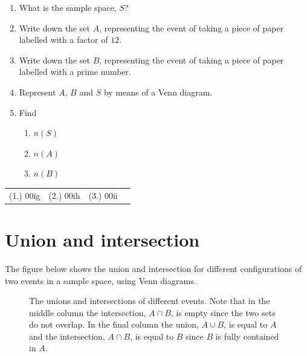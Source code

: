 \begin{exercises}{}
{\begin{enumerate}[itemsep=5pt, label=\textbf{\arabic*}. ]
\begin{enumerate}[noitemsep, label=\textbf{(\alph*)} ]
    \item What is the sample space, $S$?
    \item Write down the set $A$, representing the event of taking a
      piece of paper labelled with a factor of $12$.
    \item Write down the set $B$, representing the event of taking a
      piece of paper labelled with a prime number.
    \item Represent $A$, $B$ and $S$ by means of a Venn diagram.
    \item Find
      \begin{enumerate}[noitemsep, label=\textbf{\roman*.} ]
      \item $n\left(S\right)$
      \item $n\left(A\right)$
      \item $n\left(B\right)$
      \end{enumerate}
    \end{enumerate}
  \end{enumerate}
\practiceinfo

  \begin{tabularx}{\textwidth}{XXXX}
    (1.) 00ig& (2.) 00ih& (3.) 00ii\\
  \end{tabularx}
}
\end{exercises}

\section{Union and intersection}

The figure below shows the union and intersection for different
configurations of two events in a sample space, using Venn diagrams.

\begin{figure}[H]
  
  \begin{caption*}{The unions and intersections of different events. Note that
    in the middle column the intersection, $A \cap B$, is empty since
    the two sets do not overlap. In the final column the union,
    $A \cup B$, is equal to $A$ and the intersection, $A \cap B$, is
    equal to $B$ since $B$ is fully contained in $A$.}\end{caption*}
  \label{fig:venn_union_intersection}
\end{figure}

